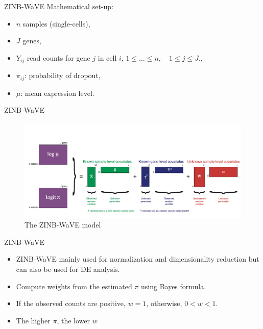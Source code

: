 \documentclass{beamer}
\begin{document}
\begin{frame}{ZINB-WaVE}
Mathematical set-up:
\begin{itemize}
  \itemsep10pt
  \item $n$ samples (single-cells),
  \item $J$ genes,
  \item $Y_{ij}$ read counts for gene $j$ in cell $i$, $1\leq \ldots \leq n, \quad 1\leq j \leq J.$,
  \item $\pi_{ij}$: probability of dropout,
  \item $\mu$: mean expression level.
\end{itemize}

\end{frame}




\begin{frame}{ZINB-WaVE}
\begin{figure}
  \centering
      \includegraphics[height=0.5\textheight]{zinbwave}
      \caption{The ZINB-WaVE model}
\end{figure}
\end{frame}

\begin{frame}{ZINB-WaVE}

\begin{itemize}
  \itemsep10pt
  \item ZINB-WaVE mainly used for normalization and dimensionality reduction but can also be used for DE analysis.
  \item Compute weights from the estimated $\pi$ using Bayes formula.
  \item If the observed counts are positive, $w = 1$, otherwise, $0<w<1$.
  \item The higher $\pi$, the lower $w$
\end{itemize}

\end{frame}
\end{document}
